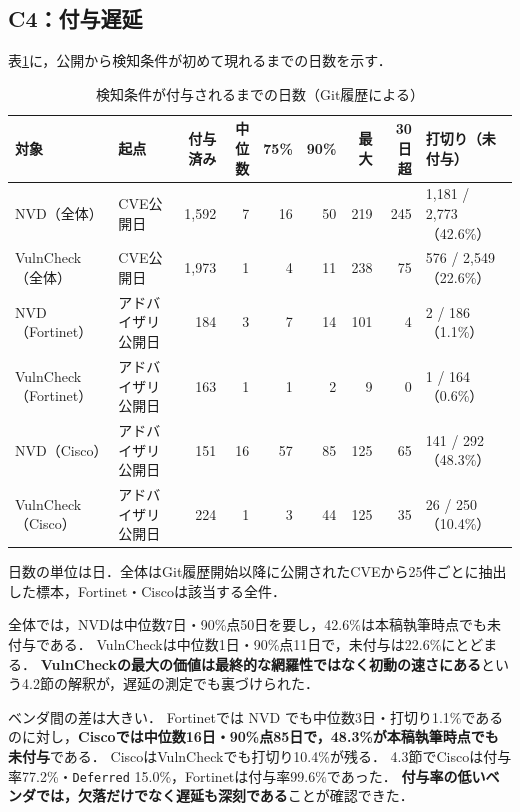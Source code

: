 \subsection{C4：付与遅延}

表\ref{tab:delay}に，公開から検知条件が初めて現れるまでの日数を示す．

\begin{table}[htbp]
  \caption{検知条件が付与されるまでの日数（Git履歴による）}
  \label{tab:delay}
  \begin{center}
  \begin{tabular}{llrrrrrrl}
    \hline
    対象 & 起点 & 付与済み & 中位数 & 75\% & 90\% & 最大 & 30日超 & 打切り（未付与） \\
    \hline
    NVD（全体） & CVE公開日 & 1,592 & 7 & 16 & 50 & 219 & 245 & 1,181 / 2,773（42.6\%） \\
    VulnCheck（全体） & CVE公開日 & 1,973 & 1 & 4 & 11 & 238 & 75 & 576 / 2,549（22.6\%） \\
    NVD（Fortinet） & アドバイザリ公開日 & 184 & 3 & 7 & 14 & 101 & 4 & 2 / 186（1.1\%） \\
    VulnCheck（Fortinet） & アドバイザリ公開日 & 163 & 1 & 1 & 2 & 9 & 0 & 1 / 164（0.6\%） \\
    NVD（Cisco） & アドバイザリ公開日 & 151 & 16 & 57 & 85 & 125 & 65 & 141 / 292（48.3\%） \\
    VulnCheck（Cisco） & アドバイザリ公開日 & 224 & 1 & 3 & 44 & 125 & 35 & 26 / 250（10.4\%） \\
    \hline
  \end{tabular}
  \end{center}
  \footnotesize
  日数の単位は日．全体はGit履歴開始以降に公開されたCVEから25件ごとに抽出した標本，Fortinet・Ciscoは該当する全件．
\end{table}

全体では，NVDは中位数7日・90\%点50日を要し，42.6\%は本稿執筆時点でも未付与である．
VulnCheckは中位数1日・90\%点11日で，未付与は22.6\%にとどまる．
\textbf{VulnCheckの最大の価値は最終的な網羅性ではなく初動の速さにある}という4.2節の解釈が，遅延の測定でも裏づけられた．

ベンダ間の差は大きい．
Fortinetでは NVD でも中位数3日・打切り1.1\%であるのに対し，\textbf{Ciscoでは中位数16日・90\%点85日で，48.3\%が本稿執筆時点でも未付与}である．
CiscoはVulnCheckでも打切り10.4\%が残る．
4.3節でCiscoは付与率77.2\%・\texttt{Deferred} 15.0\%，Fortinetは付与率99.6\%であった．
\textbf{付与率の低いベンダでは，欠落だけでなく遅延も深刻である}ことが確認できた．

